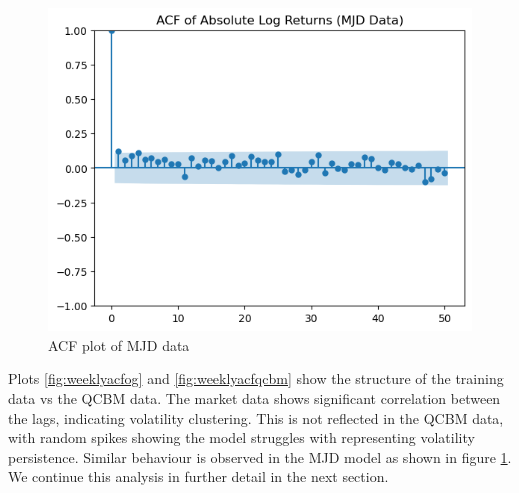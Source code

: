 \documentclass[12pt]{article}
\numberwithin{equation}{section}
\begin{document}
\begin{figure}[h!]
  \centering
  \includegraphics[scale=0.5]{acfmjd.png}
  \caption{ACF plot of MJD data}
  \label{fig:weeklyacfmjd}
\end{figure}
Plots \ref{fig:weeklyacfog} and \ref{fig:weeklyacfqcbm} show the structure of 
the training data vs the QCBM data. The market data shows significant correlation 
between the lags, indicating volatility clustering. This is not reflected in the 
QCBM data, with random spikes showing the model struggles with representing 
volatility persistence. Similar behaviour is observed in the MJD model as shown in 
figure \ref{fig:weeklyacfmjd}. We continue this analysis in further detail in the next section. 
\newpage
\end{document}
